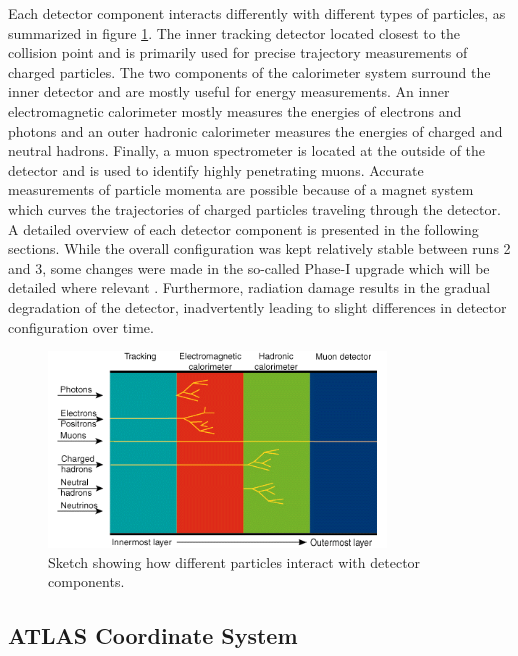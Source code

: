 Each detector component interacts differently with different types of particles, as summarized in figure 
\ref{fig:Detector_Interactions}. The inner tracking detector located closest to the collision point and is primarily used for 
precise trajectory measurements of charged particles. The two components of the calorimeter system surround the inner detector 
and are mostly useful for energy measurements. An inner electromagnetic calorimeter mostly measures the energies of electrons 
and photons and an outer hadronic calorimeter measures the energies of charged and neutral hadrons. Finally, a muon spectrometer 
is located at the outside of the detector and is used to identify highly penetrating muons. Accurate measurements of particle 
momenta are possible because of a magnet system which curves the trajectories of charged particles traveling through the detector. 
A detailed overview of each detector component is presented in the following sections. While the overall configuration was kept 
relatively stable between runs 2 and 3, some changes were made in the so-called Phase-I upgrade which will be detailed where 
relevant \cite{atlas-run3-setup}. Furthermore, radiation damage results in the gradual degradation of the detector, inadvertently 
leading to slight differences in detector configuration over time.


\begin{figure}
\centering
    \includegraphics[width=0.8\textwidth]{images/Detector_Interactions.png}
    \caption{Sketch showing how different particles interact with detector components.}
    \label{fig:Detector_Interactions}
\end{figure}

\subsection{ATLAS Coordinate System}

